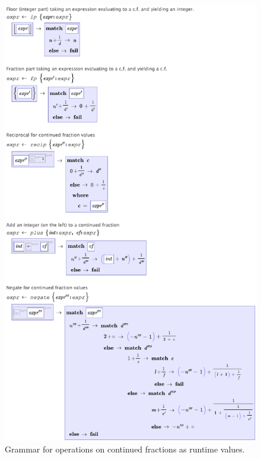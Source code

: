 \begin{figure}[th]
  \centering
  
  
  \includegraphics[scale=0.5]{src/image/continued-ops.pdf}
  
  \caption{Grammar for operations on continued fractions as runtime values.}
  \label{fig-cf}
\end{figure}

